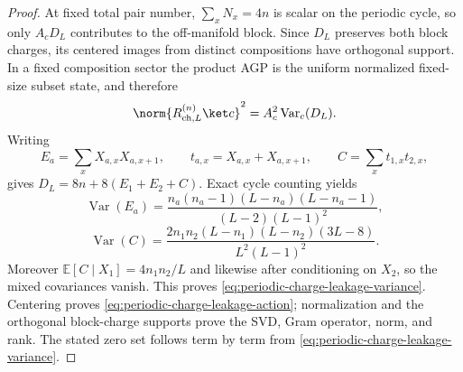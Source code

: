 \begin{proof}
At fixed total pair number, $\sum_x N_x=4n$ is scalar on the periodic cycle, so
only $A_c D_L$ contributes to the off-manifold block.  Since $D_L$ preserves both
block charges, its centered images from distinct compositions have orthogonal
support.  In a fixed composition sector the product AGP is the uniform
normalized fixed-size subset state, and therefore
\[
 \norm{R_{{\rm ch},L}^{(n)}\ket c}^2
 =A_c^2\operatorname{Var}_c(D_L).
\]
Writing
\[
 E_a=\sum_x X_{a,x}X_{a,x+1},\qquad
 t_{a,x}=X_{a,x}+X_{a,x+1},\qquad
 C=\sum_x t_{1,x}t_{2,x},
\]
gives $D_L=8n+8(E_1+E_2+C)$.  Exact cycle counting yields
\[
 \operatorname{Var}(E_a)=
 \frac{n_a(n_a-1)(L-n_a)(L-n_a-1)}{(L-2)(L-1)^2},
\]
\[
 \operatorname{Var}(C)=
 \frac{2n_1n_2(L-n_1)(L-n_2)(3L-8)}{L^2(L-1)^2}.
\]
Moreover $\mathbb E[C\mid X_1]=4n_1n_2/L$ and likewise after conditioning on
$X_2$, so the mixed covariances vanish.  This proves
\eqref{eq:periodic-charge-leakage-variance}.  Centering proves
\eqref{eq:periodic-charge-leakage-action}; normalization and the orthogonal
block-charge supports prove the SVD, Gram operator, norm, and rank.  The stated
zero set follows term by term from \eqref{eq:periodic-charge-leakage-variance}.
\end{proof}

